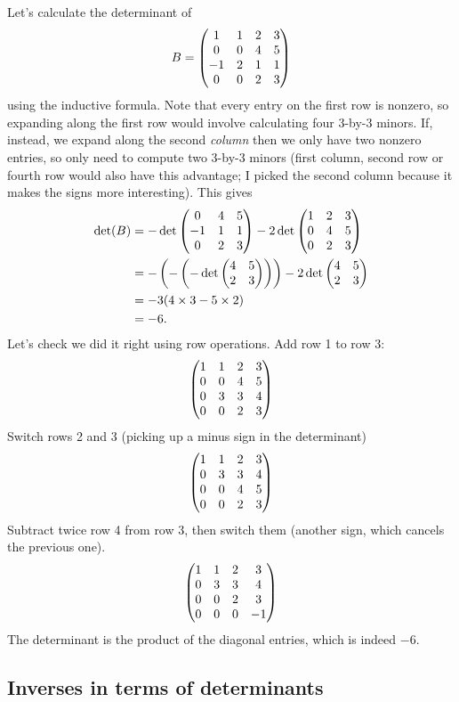 \documentclass{article}
\begin{document}
\begin{Example}
Let's calculate the determinant of \[B=\begin{pmatrix} 1 & 1 & 2 & 3 \\ 0 & 0 &
4 & 5 \\ -1 & 2 & 1 & 1 \\ 0 & 0 & 2 & 3\end{pmatrix}\] using the inductive
formula. Note that every entry on the first row is nonzero, so
expanding along the first row would involve calculating four 3-by-3
minors. If, instead, we expand along the second {\em column} then we
only have two nonzero entries, so only need to compute two 3-by-3
minors (first column, second row or fourth row would also have this
advantage; I picked the second column because it makes the signs
more interesting). This gives
\begin{align*}
\det(B)&=-\det\begin{pmatrix} 0 & 4 & 5 \\ -1 & 1 & 1\\ 0 & 2 & 3\end{pmatrix} - 2\det\begin{pmatrix} 1 & 2 & 3 \\ 0 & 4 & 5 \\ 0 & 2 & 3 \end{pmatrix}\\
&=-\left(-\left(-\det\begin{pmatrix} 4 & 5 \\ 2 & 3\end{pmatrix}\right)\right)-2\det\begin{pmatrix} 4 & 5 \\ 2 & 3\end{pmatrix}\\
&=-3(4\times 3-5\times 2)\\
&=-6.
\end{align*}
Let's check we did it right using row operations. Add row 1 to row
3: \[\begin{pmatrix} 1 & 1 & 2 & 3 \\ 0 & 0 & 4 & 5 \\ 0 & 3 & 3 & 4 \\ 0 & 0 &
2 & 3\end{pmatrix}\] Switch rows 2 and 3 (picking up a minus sign in the
determinant) \[\begin{pmatrix} 1 & 1 & 2 & 3 \\ 0 & 3 & 3 & 4 \\ 0 & 0 & 4 & 5
\\ 0 & 0 & 2 & 3\end{pmatrix}\] Subtract twice row 4 from row 3, then switch
them (another sign, which cancels the previous one). \[\begin{pmatrix} 1 & 1 &
2 & 3 \\ 0 & 3 & 3 & 4 \\ 0 & 0 & 2 & 3\\ 0 & 0 & 0 & -1 \end{pmatrix}\] The
determinant is the product of the diagonal entries, which is indeed
\(-6\).




\end{Example}
\subsection{Inverses in terms of determinants}
\end{document}
